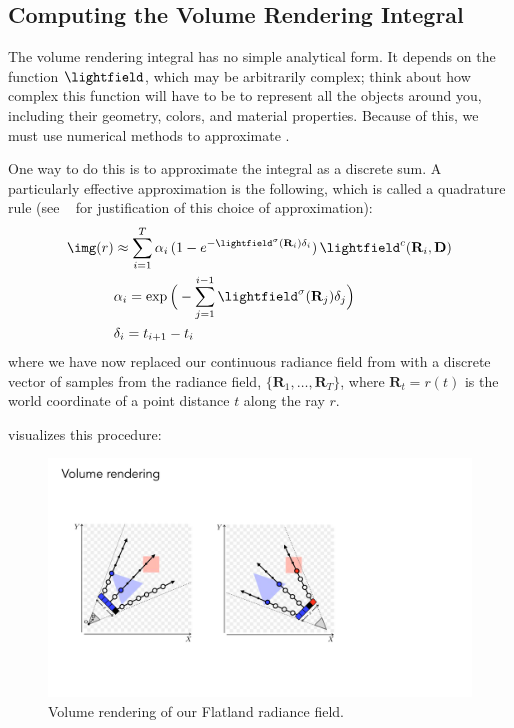 \subsection{Computing the Volume Rendering Integral}

The volume rendering integral has no simple analytical form. It depends on the function $\lightfield$, which may be arbitrarily complex;
think about how complex this function will have to be to represent all the objects around you, including their geometry, colors, and material properties.
Because of this, we must use numerical methods to approximate \eqn{\ref{eqn:nerfs:vol_rendering_integral}}.

One way to do this is to approximate the integral as a discrete sum. A particularly effective approximation is the following,
which is called a quadrature rule (see ~\cite{max1995optical,max2005local} for justification of this choice of approximation):
\begin{align}
    \img(r) & \approx \sum_{i=1}^T \alpha_i \, (1-e^{-\lightfield^\sigma(\mathbf{R}_i)\delta_i}) \, \lightfield^c(\mathbf{R}_i, \mathbf{D}) \\
            & \alpha_i = \exp\Big(-\sum_{j=1}^{i-1} \lightfield^\sigma(\mathbf{R}_j)\delta_j\Big)                                           \\
            & \delta_i = t_{i+1} - t_i
\end{align}
where we have now replaced our continuous radiance field from \eqn{\ref{eqn:nerfs:vol_rendering_integral}} with a discrete vector of samples from the radiance field,
$\{\mathbf{R}_1, \ldots, \mathbf{R}_T\}$, where $\mathbf{R}_t = r(t)$ is the world coordinate of a point distance $t$ along the ray $r$.

\Fig{\ref{fig:nerfs:flatland_volume_rendering}} visualizes this procedure:
\begin{figure}[h!]
    \centerline{
        \includegraphics[width=0.75\linewidth]{figures/nerfs/flatland_volume_rendering.pdf}
    }
    \caption{Volume rendering of our Flatland radiance field.}
    \label{fig:nerfs:flatland_volume_rendering}
\end{figure}

